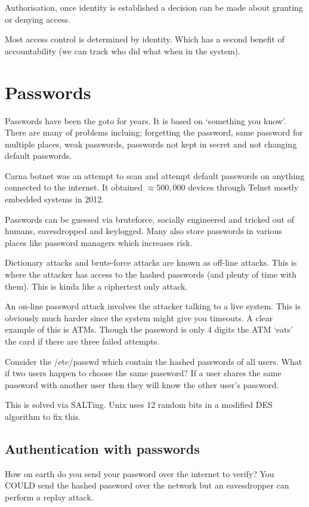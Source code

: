 \documentclass{report}
\begin{document}
Authorisation, once identity is established a decision can be made about
granting or denying access.

Most access control is determined by identity. Which has a second benefit of
accountability (we can track who did what when in the system).

\section{Passwords}
Passwords have been the goto for years. It is based on `something you know'.
There are many of problems incluing; forgetting the password, same password for
multiple places, weak passwords, passwords not kept in secret and not changing
default passwords.

Carna botnet was an attempt to scan and attempt default passwords on anything
connected to the internet. It obtained $\approx 500,000$
devices through Telnet mostly embedded systems in 2012.

Passwords can be guessed via bruteforce, socially engineered and tricked out of
humans, eavesdropped and keylogged. Many also store passwords in various places
like password managers which increases risk.

Dictionary attacks and brute-force attacks are known as off-line attacks. This
is where the attacker has access to the hashed passwords (and plenty of time
with them). This is kinda like a ciphertext only attack.

An on-line password attack involves the attacker talking to a live system. This
is obviously much harder since the system might give you timeouts. A clear
example of this is ATMs. Though the password is only 4 digits the ATM `eats' the
card if there are three failed attempts.

Consider the /etc/passwd
which contain the hashed passwords of all users.
What if two users happen to choose the same password?  If a user shares the same
password with another user then they will know the other user's password.

This is solved via SALTing. Unix uses 12 random bits in a modified DES algorithm
to fix this.

\subsection{Authentication with passwords}
How on earth do you send your password over the internet to verify?
You COULD send the hashed password over the network but an eavesdropper can
perform a replay attack.
\end{document}
